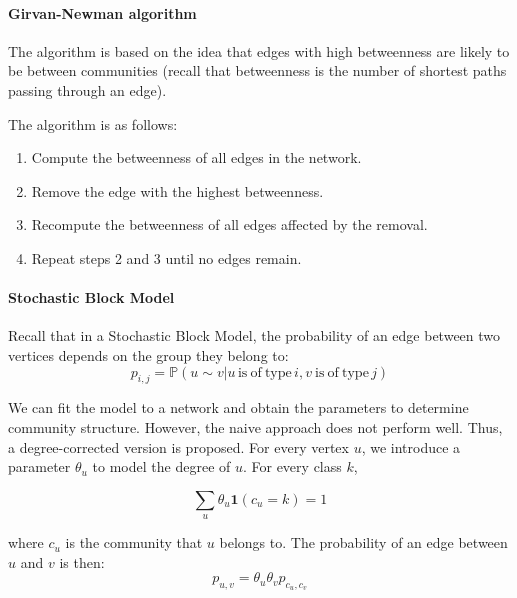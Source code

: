 \documentclass{article}
\begin{document}
\paragraph{Girvan-Newman algorithm} The algorithm is based on the idea that edges with high betweenness are likely to be between communities (recall that betweenness is the number of shortest paths passing through an edge).

The algorithm is as follows:
\begin{enumerate}
    \item Compute the betweenness of all edges in the network.
    \item Remove the edge with the highest betweenness.
    \item Recompute the betweenness of all edges affected by the removal.
    \item Repeat steps 2 and 3 until no edges remain.
\end{enumerate}

\paragraph{Stochastic Block Model}
Recall that in a Stochastic Block Model, the probability of an edge between two vertices depends on the group they belong to: 
\begin{equation*}
    p_{i,j}=\mathbb{P}(u\sim v|u\,\mathrm{is~of~type}\,i,v{\mathrm{~is~of~type}}\,j)
\end{equation*}


We can fit the model to a network and obtain the parameters to determine community structure. However, the naive approach does not perform well. Thus, a degree-corrected version is proposed.  For every vertex $u$, we introduce a parameter $\theta_u$ to model the degree of $u$. For every class $k$,

\begin{equation*}
    \sum_{u}\theta_{u}\mathbf{1}(c_{u}=k)=1
\end{equation*}

where $c_u$ is the community that $u$ belongs to. The probability of an edge between $u$ and $v$ is then:
\begin{equation*}
    p_{u,v}=\theta_{u}\theta_{v}p_{c_{u},c_{v}}
\end{equation*}

\newpage


\end{document}
